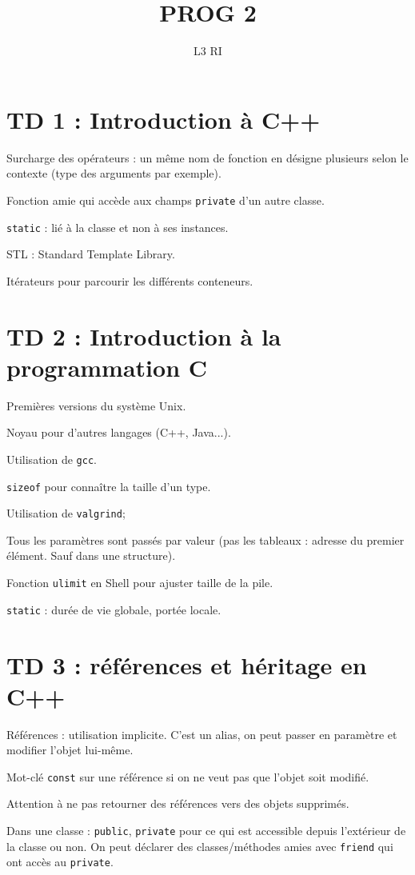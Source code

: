 \documentclass[french]{article}
\title{PROG 2}
\date{}
\author{L3 RI}
\def\code#1{\texttt{#1}}
\begin{document}
\maketitle
\section*{TD 1 : Introduction à C++}
Surcharge des opérateurs : un même nom de fonction en désigne plusieurs selon le contexte (type des arguments par exemple).

Fonction amie qui accède aux champs \code{private} d'un autre classe.

\code{static} : lié à la classe et non à ses instances.

STL : Standard Template Library.

Itérateurs pour parcourir les différents conteneurs.

\section*{TD 2 : Introduction à la programmation C}
Premières versions du système Unix.

Noyau pour d'autres langages (C++, Java...).

Utilisation de \code{gcc}.

\code{sizeof} pour connaître la taille d'un type.

Utilisation de \code{valgrind};

Tous les paramètres sont passés par valeur (pas les tableaux : adresse du premier élément. Sauf dans une structure).

Fonction \code{ulimit} en Shell pour ajuster taille de la pile.

\code{static} : durée de vie globale, portée locale.

\section*{TD 3 : références et héritage en C++}
Références : utilisation implicite. C'est un alias, on peut passer en paramètre et modifier l'objet lui-même.

Mot-clé \code{const} sur une référence si on ne veut pas que l'objet soit modifié.

Attention à ne pas retourner des références vers des objets supprimés.

Dans une classe : \code{public}, \code{private} pour ce qui est accessible depuis l'extérieur de la classe ou non. On peut déclarer des classes/méthodes amies avec \code{friend} qui ont accès au \code{private}.
\end{document}
